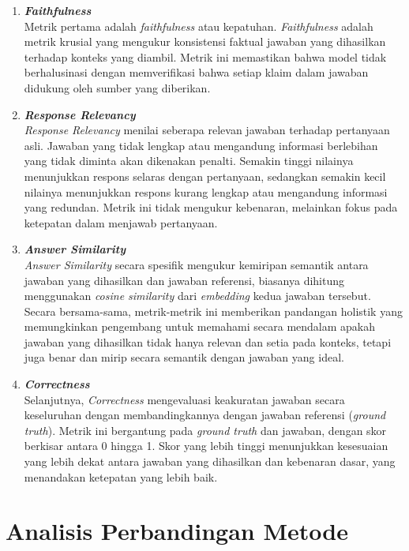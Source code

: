 \begin{enumerate}
	\item \textbf{\textit{Faithfulness}} \\
	      Metrik pertama adalah \textit{faithfulness} atau kepatuhan.
	      \textit{Faithfulness} adalah metrik krusial yang mengukur konsistensi faktual jawaban yang dihasilkan terhadap konteks yang diambil.
	      Metrik ini memastikan bahwa model tidak berhalusinasi dengan memverifikasi bahwa setiap klaim dalam jawaban didukung oleh sumber yang diberikan.
	\item \textbf{\textit{Response Relevancy}} \\
	      \textit{Response Relevancy} menilai seberapa relevan jawaban terhadap pertanyaan asli.
	      Jawaban yang tidak lengkap atau mengandung informasi berlebihan yang tidak diminta akan dikenakan penalti.
	      Semakin tinggi nilainya menunjukkan respons selaras dengan pertanyaan, sedangkan semakin kecil nilainya menunjukkan respons kurang lengkap atau mengandung informasi yang redundan.
	      Metrik ini tidak mengukur kebenaran, melainkan fokus pada ketepatan dalam menjawab pertanyaan.
	\item \textbf{\textit{Answer Similarity}} \\
	      \textit{Answer Similarity} secara spesifik mengukur kemiripan semantik antara jawaban yang dihasilkan dan jawaban referensi, biasanya dihitung menggunakan \textit{cosine similarity} dari \textit{embedding} kedua jawaban tersebut.
	      Secara bersama-sama, metrik-metrik ini memberikan pandangan holistik yang memungkinkan pengembang untuk memahami secara mendalam apakah jawaban yang dihasilkan tidak hanya relevan dan setia pada konteks, tetapi juga benar dan mirip secara semantik dengan jawaban yang ideal.
	\item \textbf{\textit{Correctness}} \\
	      Selanjutnya, \textit{Correctness} mengevaluasi keakuratan jawaban secara keseluruhan dengan membandingkannya dengan jawaban referensi (\textit{ground truth}).
	      Metrik ini bergantung pada \textit{ground truth} dan jawaban, dengan skor berkisar antara 0 hingga 1.
	      Skor yang lebih tinggi menunjukkan kesesuaian yang lebih dekat antara jawaban yang dihasilkan dan kebenaran dasar, yang menandakan ketepatan yang lebih baik.
\end{enumerate}


\section{Analisis Perbandingan Metode}

